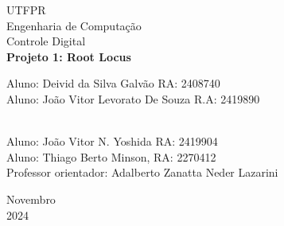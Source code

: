 \documentclass[a4paper, 12pt]{article}
\begin{document}

\begin{titlepage}
	\begin{center}
	

		\Huge{UTFPR}\\
		\large{Engenharia de Computação}\\ 
		\large{Controle Digital}\\ 
		\vspace{15pt}
        \vspace{95pt}
        \textbf{\LARGE{Projeto 1: Root Locus }}\\
		\vspace{3,5cm}
	\end{center}
	
	\begin{flushleft}
		\begin{tabbing}
			  Aluno: Deivid da Silva Galvão RA: 2408740\\
                Aluno: João Vitor Levorato De Souza
R.A: 2419890

\\
                Aluno: João Vitor N. Yoshida RA: 2419904\\
                Aluno: Thiago Berto Minson, RA: 2270412\\
			Professor orientador: Adalberto Zanatta Neder Lazarini \\
	\end{tabbing}
 \end{flushleft}
	\vspace{1cm}
	
	\begin{center}
		\vspace{\fill}
			 Novembro\\
		 2024
			\end{center}
\end{titlepage}

\end{document}
